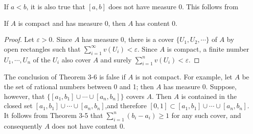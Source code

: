 If $a < b$, it is also true that $[a,b]$ does not have measure 0.
This follows from 
\begin{theorem}
    If $A$ is compact and has measure 0, then $A$ has content 0.
\end{theorem}

\begin{proof}
    Let $\varepsilon>0$. Since $A$ has measure 0, there is a cover 
    $\{U_1, U_2,\cdots\}$ of $A$ by open rectangles such that 
    $\sum_{i=1}^{\infty}{v(U_i)} <\varepsilon$. Since $A$ is compact,
    a finite number $U_1, \cdots, U_n$ of the $U_i$ also cover $A$
    and surely $\sum_{i=1}^{n}{v(U_i)} <\varepsilon$.
\end{proof}

The conclusion of Theorem 3-6 is false if $A$ is not compact.
For example, let $A$ be the set of rational numbers between 0
and 1; then $A$ has measure 0. Suppose, however, that 
$\{[a_1, b_1]\cup \cdots \cup [a_n,b_n]\}$ covers $A$. Then $A$
is contained in the closed set $[a_1, b_1]\cup \cdots \cup [a_n,b_n]$,and 
therefore $[0, 1]\subset [a_1, b_1]\cup \cdots \cup [a_n,b_n]$. It follows 
from Theorem 3-5 that $\sum_{i=1 }^{n }{(b_i-a_i)}\ge 1$ for any such cover, and 
consequently $A$ does not have content 0.




